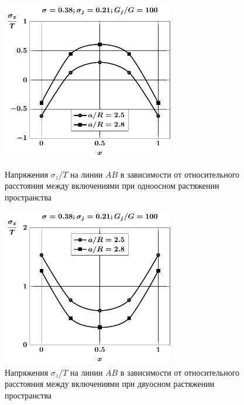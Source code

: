 \begin{figure}[h!]
\centering\footnotesize
\parbox[b]{7.5cm}{\centering\includegraphics[width=7.5cm]{inc13-a-d95-g100-t1-sig_z-ab.pdf}
\caption{Напряжения $\sigma_z/T$ на линии  $AB$ в зависимости от относительного расстояния между включениями при одноосном растяжении пространства
\label{f:8:76}}}\hfil\hfil
\parbox[b]{7.5cm}{\centering\includegraphics[width=7.5cm]{inc13-a-d95-g100-t2-sig_z-ab.pdf}
\caption{Напряжения $\sigma_z/T$ на линии  $AB$ в зависимости от относительного расстояния между включениями при двуосном растяжении пространства
\label{f:8:77}}}
\end{figure}

